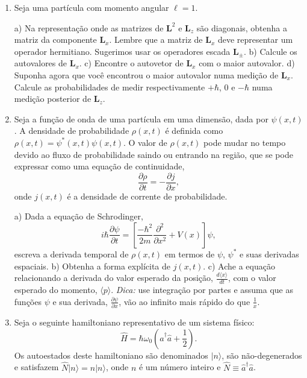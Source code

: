 \begin{enumerate}[start=1,label={\bfseries Q\arabic*.}]
\item Seja uma partícula com momento angular $\ell = 1$.

a) Na representação onde as matrizes de $\mathbf{L}^{2}$ e $\mathbf{L}_{z}$ são diagonais, obtenha a matriz da componente $\mathbf{L}_{x}$. Lembre que a matriz de $\mathbf{L}_{x}$ deve representar um operador hermitiano. Sugerimos usar os operadores escada $\mathbf{L}_{\pm}$.
b) Calcule os autovalores de $\mathbf{L}_{x}$.
c) Encontre o autovetor de $\mathbf{L}_{x}$ com o maior autovalor.
d) Suponha agora que você encontrou o maior autovalor numa medição de $\mathbf{L}_{x}$. Calcule as probabilidades de medir respectivamente $+\hbar$, 0 e $-\hbar$  numa medição posterior de $\mathbf{L}_{z}$.



\item Seja a função de onda de uma partícula em uma dimensão, dada por $\psi(x,t)$. A densidade de probabilidade $\rho(x,t)$ é definida como $\rho(x,t) = \psi^{*}(x,t) \psi(x,t)$. O valor de $\rho(x,t)$ pode mudar no tempo devido ao fluxo de probabilidade saindo ou entrando na região, que se pode expressar como uma equação de continuidade,
$$
\frac{\partial \rho}{\partial t} = - \frac{\partial j}{\partial x},
$$
onde $j(x,t)$ é a densidade de corrente de probabilidade.


  a) Dada a equação de Schrodinger,
  $$
  i \hbar \frac{\partial \psi}{\partial t} = \left[ \frac{- \hbar^{2}}{2m} \frac{\partial^{2}}{\partial x^{2}} + V(x) \right] \psi ,
  $$
  escreva a derivada temporal de $\rho(x,t)$ em termos de $\psi$, $\psi^{*}$ e suas derivadas espaciais.
  b) Obtenha a forma explícita de $j(x,t)$.
  c) Ache a equação relacionando a derivada do valor esperado da posição, $\frac{d \langle x \rangle}{d t}$, com o valor esperado do momento, $\langle p \rangle$. \textit{Dica:} use integração por partes e assuma que as funções $\psi$  e sua derivada, $\frac{\partial \psi}{\partial x}$, vão ao infinito mais rápido do que $\frac{1}{x}$.



\item Seja o seguinte hamiltoniano representativo de um sistema físico:
$$
\hat{H} = \hbar \omega_{0} \left( \hat{a}^{\dagger} \hat{a} + \frac{1}{2} \right).
$$
Os autoestados deste hamiltoniano são denominados $| n \rangle$, são não-degenerados e satisfazem $\hat{N}|n\rangle = n|n\rangle$, onde $n$ é um número inteiro e $\hat{N} \equiv \hat{a}^{\dagger} \hat{a}$.



\end{enumerate}
